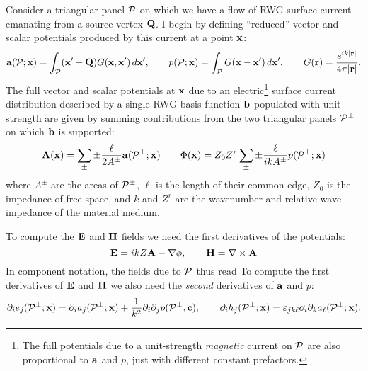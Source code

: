 \documentclass[letterpaper]{article}
\begin{document}
Consider a triangular panel $\mathcal{P}$ on which we have a flow of RWG 
surface current emanating from a source vertex $\mathbf{Q}$. I begin by 
defining ``reduced'' vector and scalar potentials produced by this 
current at a point $\mathbf{x}$:
$$ \mathbf{a}(\mathcal{P};\mathbf{x}) = 
   \int_{\mathcal{P}} (\mathbf{x}^\prime - \mathbf{Q}) G(\mathbf{x}, \mathbf{x}^\prime) \, d\mathbf{x}^\prime,
   \qquad
   p(\mathcal{P}; \mathbf{x}) = 
   \int_{\mathcal{P}} G(\mathbf{x}- \mathbf{x}^\prime) \, d\mathbf{x}^\prime,
  \qquad
  G(\mathbf{r})=\frac{e^{ik|\mathbf{r}|}}{4\pi |\mathbf{r}|}.
$$
The full vector and scalar potentials at $\mathbf{x}$ due to an 
electric\footnote{The full potentials due to a unit-strength
\textit{magnetic} current on $\mathcal{P}$ are also proportional
to $\mathbf{a}$ and $p$, just with different constant prefactors.}
surface current distribution described by a single RWG basis
function $\mathbf{b}$ populated with unit strength are given by 
summing contributions from the two triangular panels $\mathcal{P}^\pm$
on which $\mathbf{b}$ is supported:
$$
 \mathbf{A}(\mathbf{x}) = \sum_{\pm} \pm \frac{\ell}{2A^\pm} \mathbf{a}(\mathcal{P}^\pm; \mathbf{x})
 \qquad 
 \Phi(\mathbf{x}) = Z_0Z^r \sum_{\pm} \pm \frac{\ell}{ik A^\pm} p(\mathcal{P}^\pm; \mathbf{x})
$$
where $A^\pm$ are the areas of $\mathcal{P}^\pm$, $\ell$ is the length
of their common edge, 
$Z_0$ is the impedance of free space, and $k$ and $Z^r$ are the
wavenumber and relative wave impedance of the material medium.

To compute the $\mathbf{E}$ and $\mathbf{H}$ fields we need the first derivatives
of the potentials: 
$$ \mathbf{E} = ikZ \mathbf{A} - \nabla \phi, \qquad \mathbf{H} = \nabla \times \mathbf{A}$$
In component notation, the fields due to $\mathcal{P}$ thus read
To compute the first derivatives of $\mathbf{E}$ and $\mathbf{H}$ we also
need the \textit{second} derivatives of $\mathbf{a}$ and $p$:
$$ \partial_i e_j(\mathcal{P}^\pm; \mathbf{x})
   =   \partial_i a_j(\mathcal{P}^\pm; \mathbf{x}) 
     + \frac{1}{k^2}\partial_i \partial_j p(\mathcal{P}^\pm, \mathbf{c}),
  \qquad
   \partial_i h_j(\mathcal{P}^\pm; \mathbf{x})
   =\varepsilon_{jk\ell} \partial_i \partial_k a_\ell(\mathcal{P}^\pm; \mathbf{x}).
$$
\end{document}
